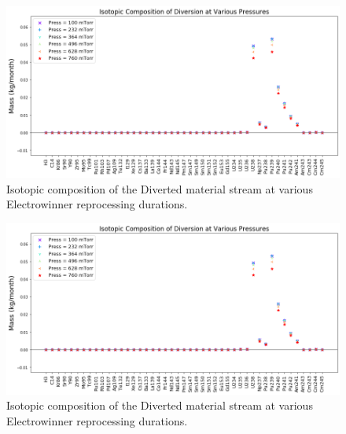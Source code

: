 \begin{figure}
	\includegraphics[width=\linewidth]{images/pressure-sa-comp}
	\caption{Isotopic composition of the Diverted material stream at various Electrowinner reprocessing durations.}
	\label{fig:win-time-sa}
\end{figure}

\begin{figure}
	\includegraphics[width=\linewidth]{images/pressure-sa-comp}
	\caption{Isotopic composition of the Diverted material stream at various Electrowinner reprocessing durations.}
	\label{fig:win-time-diff}
\end{figure}